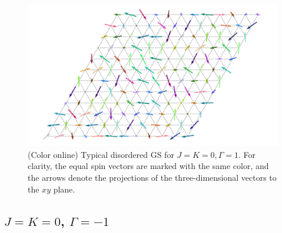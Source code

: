 \documentclass[aps,prb,reprint,amsfonts,amsmath,amssymb,showpacs,groupedaddress,superscriptaddress]{revtex4-1}
\begin{document}
\begin{figure}
    \centering
    \includegraphics[width=\columnwidth]{fig/SpinConfigForPositiveGamma.pdf}
    \caption{\label{fig:GSForPositiveGamma}(Color online) Typical disordered GS for $J=K=0, \Gamma=1$. For clarity, the equal spin vectors are marked with the same color, and the arrows denote the projections of the three-dimensional vectors to the $xy$ plane.}
\end{figure}

\subsection{$J=K=0$, $\Gamma=-1$}
\end{document}
